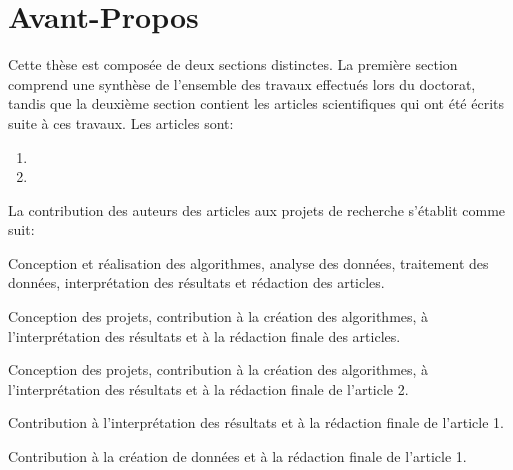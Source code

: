 \chapter*{Avant-Propos}
Cette thèse est composée de deux sections distinctes. La première section
comprend une synthèse de l’ensemble des travaux effectués lors du doctorat,
tandis que la deuxième section contient les articles scientifiques qui ont été
écrits suite à ces travaux. Les articles sont:

\begin{enumerate}

	\item {}
	\item {}

\end{enumerate}
\vspace{5mm}
\noindent
La contribution des auteurs des articles aux projets de recherche s’établit
comme suit:\\

\begin{description}[leftmargin=!,labelwidth=\widthof{\bfseries Randolf S.
Kofman}]
  \setlength\itemsep{1.2em}
  \item[Lorenzo Perozzi] Conception et réalisation des algorithmes, analyse des
données, traitement des données, interprétation des résultats et rédaction des
articles.
  \item[Bernard Giroux]  Conception des projets, contribution à la création des
algorithmes, à l’interprétation des résultats et à la rédaction finale des
articles.
  \item[Erwan Gloaguen]  Conception des projets, contribution à la création des
algorithmes, à l’interprétation des résultats et à la rédaction finale de
l'article 2.
  \item[Douglas R. Schmitt]  Contribution à
l'interprétation des résultats et à la rédaction finale de l’article 1.
  \item[Randolf S. Kofman]  Contribution à la création de données et à la
rédaction finale de l’article 1.
\end{description}
